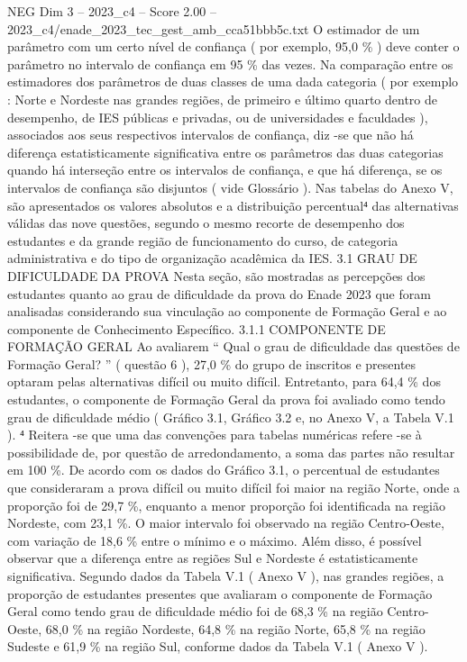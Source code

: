 \begin{textsample}{NEG Dim 3 – 2023\_c4 – Score 2.00 – 2023\_c4/enade\_2023\_tec\_gest\_amb\_cca51bbb5c.txt}
O estimador de um parâmetro com um certo nível de confiança ( por exemplo, 95,0 \% ) deve conter o parâmetro no intervalo de confiança em 95 \% das vezes.
Na comparação entre os estimadores dos parâmetros de duas classes de uma dada categoria ( por exemplo : Norte e Nordeste nas grandes regiões, de primeiro e último quarto dentro de desempenho, de IES públicas e privadas, ou de universidades e faculdades ), associados aos seus respectivos intervalos de confiança, diz -se que não há diferença estatisticamente significativa entre os parâmetros das duas categorias quando há interseção entre os intervalos de confiança, e que há diferença, se os intervalos de confiança são disjuntos ( vide Glossário ).
Nas tabelas do Anexo V, são apresentados os valores absolutos e a distribuição percentual⁴ das alternativas válidas das nove questões, segundo o mesmo recorte de desempenho dos estudantes e da grande região de funcionamento do curso, de categoria administrativa e do tipo de organização acadêmica da IES. 3.1 GRAU DE DIFICULDADE DA PROVA Nesta seção, são mostradas as percepções dos estudantes quanto ao grau de dificuldade da prova do Enade 2023 que foram analisadas considerando sua vinculação ao componente de Formação Geral e ao componente de Conhecimento Específico. 3.1.1 COMPONENTE DE FORMAÇÃO GERAL Ao avaliarem “ Qual o grau de dificuldade das questões de Formação Geral? ” ( questão 6 ), 27,0 \% do grupo de inscritos e presentes optaram pelas alternativas difícil ou muito difícil.
Entretanto, para 64,4 \% dos estudantes, o componente de Formação Geral da prova foi avaliado como tendo grau de dificuldade médio ( Gráfico 3.1, Gráfico 3.2 e, no Anexo V, a Tabela V.1 ). ⁴ Reitera -se que uma das convenções para tabelas numéricas refere -se à possibilidade de, por questão de arredondamento, a soma das partes não resultar em 100 \%.
De acordo com os dados do Gráfico 3.1, o percentual de estudantes que consideraram a prova difícil ou muito difícil foi maior na região Norte, onde a proporção foi de 29,7 \%, enquanto a menor proporção foi identificada na região Nordeste, com 23,1 \%.
O maior intervalo foi observado na região Centro-Oeste, com variação de 18,6 \% entre o mínimo e o máximo.
Além disso, é possível observar que a diferença entre as regiões Sul e Nordeste é estatisticamente significativa.
Segundo dados da Tabela V.1 ( Anexo V ), nas grandes regiões, a proporção de estudantes presentes que avaliaram o componente de Formação Geral como tendo grau de dificuldade médio foi de 68,3 \% na região Centro-Oeste, 68,0 \% na região Nordeste, 64,8 \% na região Norte, 65,8 \% na região Sudeste e 61,9 \% na região Sul, conforme dados da Tabela V.1 ( Anexo V ).

\end{textsample}
